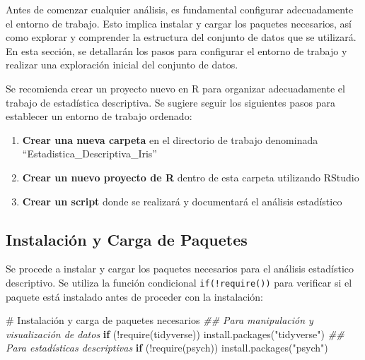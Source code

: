\documentclass[
  spanish,
  letterpaper,
]{book}
\newenvironment{Shaded}{\begin{snugshade}}{\end{snugshade}}
\newcommand{\CommentTok}[1]{\textcolor[rgb]{0.37,0.37,0.37}{#1}}
\newcommand{\ControlFlowTok}[1]{\textcolor[rgb]{0.00,0.23,0.31}{\textbf{#1}}}
\newcommand{\DocumentationTok}[1]{\textcolor[rgb]{0.37,0.37,0.37}{\textit{#1}}}
\newcommand{\FunctionTok}[1]{\textcolor[rgb]{0.28,0.35,0.67}{#1}}
\newcommand{\NormalTok}[1]{\textcolor[rgb]{0.00,0.23,0.31}{#1}}
\newcommand{\SpecialCharTok}[1]{\textcolor[rgb]{0.37,0.37,0.37}{#1}}
\newcommand{\StringTok}[1]{\textcolor[rgb]{0.13,0.47,0.30}{#1}}
\begin{document}
Antes de comenzar cualquier análisis, es fundamental configurar
adecuadamente el entorno de trabajo. Esto implica instalar y cargar los
paquetes necesarios, así como explorar y comprender la estructura del
conjunto de datos que se utilizará. En esta sección, se detallarán los
pasos para configurar el entorno de trabajo y realizar una exploración
inicial del conjunto de datos.

Se recomienda crear un proyecto nuevo en R para organizar adecuadamente
el trabajo de estadística descriptiva. Se sugiere seguir los siguientes
pasos para establecer un entorno de trabajo ordenado:

\begin{enumerate}
\def\labelenumi{\arabic{enumi}.}
\item
  \textbf{Crear una nueva carpeta} en el directorio de trabajo
  denominada ``Estadistica\_Descriptiva\_Iris''
\item
  \textbf{Crear un nuevo proyecto de R} dentro de esta carpeta
  utilizando RStudio
\item
  \textbf{Crear un script} donde se realizará y documentará el análisis
  estadístico
\end{enumerate}

\subsection{Instalación y Carga de
Paquetes}\label{instalaciuxf3n-y-carga-de-paquetes}

Se procede a instalar y cargar los paquetes necesarios para el análisis
estadístico descriptivo. Se utiliza la función condicional
\texttt{if(!require())} para verificar si el paquete está instalado
antes de proceder con la instalación:

\begin{Shaded}
\begin{Highlighting}[]
\CommentTok{\# Instalación y carga de paquetes necesarios}
\DocumentationTok{\#\# Para manipulación y visualización de datos}
\ControlFlowTok{if}\NormalTok{ (}\SpecialCharTok{!}\FunctionTok{require}\NormalTok{(tidyverse)) }\FunctionTok{install.packages}\NormalTok{(}\StringTok{"tidyverse"}\NormalTok{)}
\DocumentationTok{\#\# Para estadísticas descriptivas}
\ControlFlowTok{if}\NormalTok{ (}\SpecialCharTok{!}\FunctionTok{require}\NormalTok{(psych)) }\FunctionTok{install.packages}\NormalTok{(}\StringTok{"psych"}\NormalTok{)}
\end{Highlighting}
\end{Shaded}
\end{document}
